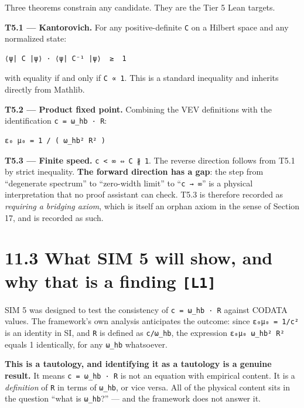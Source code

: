 \documentclass[
  11pt]{report}
\begin{document}
Three theorems constrain any candidate. They are the Tier 5 Lean
targets.

\textbf{T5.1 --- Kantorovich.} For any positive-definite \texttt{C} on a
Hilbert space and any normalized state:

\begin{verbatim}
⟨ψ| C |ψ⟩ · ⟨ψ| C⁻¹ |ψ⟩  ≥  1
\end{verbatim}

with equality if and only if \texttt{C\ ∝\ 1}. This is a standard
inequality and inherits directly from Mathlib.

\textbf{T5.2 --- Product fixed point.} Combining the VEV definitions
with the identification \texttt{c\ =\ ω\_hb\ ·\ R}:

\begin{verbatim}
ε₀ μ₀ = 1 / ( ω_hb² R² )
\end{verbatim}

\textbf{T5.3 --- Finite speed.} \texttt{c\ \textless{}\ ∞\ ⇔\ C\ ∦\ 1}.
The reverse direction follows from T5.1 by strict inequality.
\textbf{The forward direction has a gap}: the step from ``degenerate
spectrum'' to ``zero-width limit'' to ``\texttt{c\ →\ ∞}'' is a physical
interpretation that no proof assistant can check. T5.3 is therefore
recorded as \emph{requiring a bridging axiom}, which is itself an orphan
axiom in the sense of Section 17, and is recorded as such.

\hypertarget{what-sim-5-will-show-and-why-that-is-a-finding-l1}{%
\section{\texorpdfstring{11.3 What SIM 5 will show, and why that is a
finding
\texttt{{[}L1{]}}}{11.3 What SIM 5 will show, and why that is a finding {[}L1{]}}}\label{what-sim-5-will-show-and-why-that-is-a-finding-l1}}

SIM 5 was designed to test the consistency of \texttt{c\ =\ ω\_hb\ ·\ R}
against CODATA values. The framework's own analysis anticipates the
outcome: since \texttt{ε₀μ₀\ =\ 1/c²} is an identity in SI, and
\texttt{R} is defined as \texttt{c/ω\_hb}, the expression
\texttt{ε₀μ₀\ ω\_hb²\ R²} equals 1 identically, for any \texttt{ω\_hb}
whatsoever.

\textbf{This is a tautology, and identifying it as a tautology is a
genuine result.} It means \texttt{c\ =\ ω\_hb\ ·\ R} is not an equation
with empirical content. It is a \emph{definition} of \texttt{R} in terms
of \texttt{ω\_hb}, or vice versa. All of the physical content sits in
the question ``what is \texttt{ω\_hb}?'' --- and the framework does not
answer it.
\end{document}
